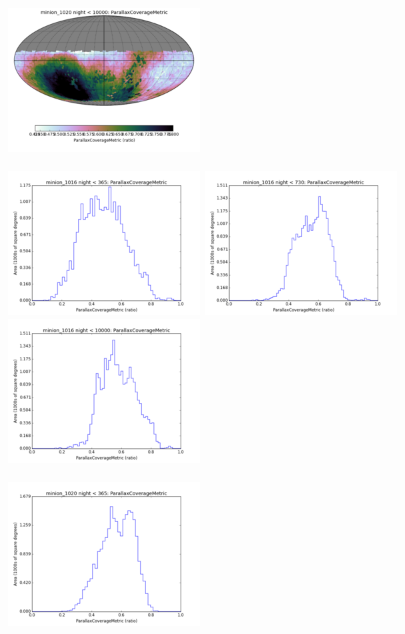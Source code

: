 \begin{figure}[ht]
\begin{center}
  \includegraphics[width=2.0in]{./figs/milkyway/astromPanels/MW_Astrom_paCovge_PanSTARRS_10y_map.png}
  \end{center}

  \begin{center}
  \includegraphics[width=2.0in]{./figs/milkyway/astromPanels/MW_Astrom_paCovge_Baseline_01y_hst.png}
  \includegraphics[width=2.0in]{./figs/milkyway/astromPanels/MW_Astrom_paCovge_Baseline_02y_hst.png}
  \includegraphics[width=2.0in]{./figs/milkyway/astromPanels/MW_Astrom_paCovge_Baseline_10y_hst.png}
  \end{center}
  \begin{center}
  \includegraphics[width=2.0in]{./figs/milkyway/astromPanels/MW_Astrom_paCovge_PanSTARRS_01y_hst.png}

\end{center}
\end{figure}
